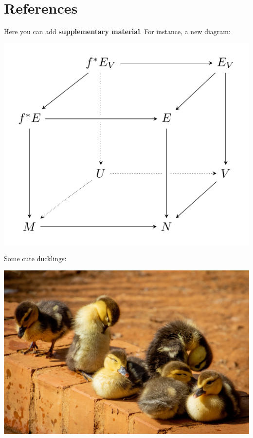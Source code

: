 \documentclass[a0paper,fleqn]{betterposter}
\begin{document}
{}{

\section{References}
\printbibliography[heading=none]


Here you can add \textbf{supplementary material}. For instance, a new diagram:
\begin{center}
\includegraphics[width=\textwidth]{img/tikzexample2}
\end{center}

Some cute ducklings:
\begin{center}
\includegraphics[width=\textwidth]{img/ducklings}
\end{center}
}
\end{document}

